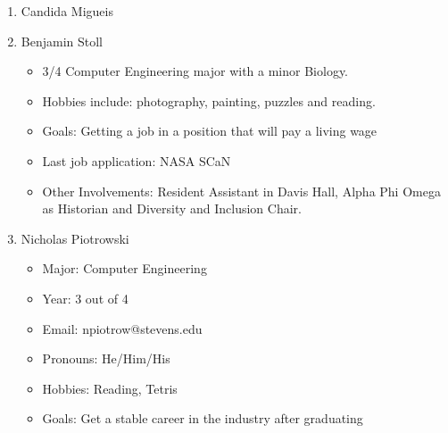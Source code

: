 \begin{enumerate}
    \item Candida Migueis
    \item Benjamin Stoll
        \begin{itemize}
            \item 3/4 Computer Engineering major with a minor Biology. 
            \item Hobbies include: photography, painting, puzzles and reading.
            \item Goals: Getting a job in a position that will pay a living wage
            \item Last job application: NASA SCaN
            \item Other Involvements: Resident Assistant in Davis Hall, Alpha Phi Omega as Historian and Diversity and Inclusion Chair.
        \end{itemize}
    \item Nicholas Piotrowski
        \begin{itemize}
        \item Major: Computer Engineering
        \item Year: 3 out of 4
        \item Email: npiotrow@stevens.edu
        \item Pronouns: He/Him/His
        \item Hobbies: Reading, Tetris
        \item Goals: Get a stable career in the industry after graduating
        \end{itemize}
\end{enumerate}
